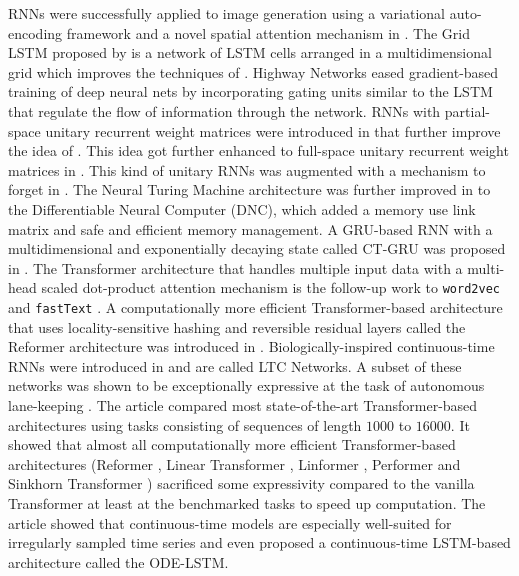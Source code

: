 \documentclass[draft,final]{vutinfth} %
\begin{document}
    RNNs were successfully applied to image generation using a variational auto-encoding framework and a novel spatial attention mechanism in \cite{draw}.
    The Grid LSTM proposed by \cite{grid_lstm} is a network of LSTM cells arranged in a multidimensional grid which improves the techniques of \cite{multidimensional_rnn}.
    Highway Networks \cite{highway_networks} eased gradient-based training of deep neural nets by incorporating gating units similar to the LSTM that regulate the flow of information through the network.
    RNNs with partial-space unitary recurrent weight matrices were introduced in \cite{UnitaryRNNs} that further improve the idea of \cite{SCRN}.
    This idea got further enhanced to full-space unitary recurrent weight matrices in \cite{EfficientUnitaryRNNs}.
    This kind of unitary RNNs was augmented with a mechanism to forget in \cite{unitary_rnn_forget}.
    The Neural Turing Machine architecture was further improved in \cite{DNC} to the Differentiable Neural Computer (DNC), which added a memory use link matrix and safe and efficient memory management.
    A GRU-based RNN with a multidimensional and exponentially decaying state called CT-GRU was proposed in \cite{CTGRU}.
    The Transformer architecture \cite{Transformer} that handles multiple input data with a multi-head scaled dot-product attention mechanism is the follow-up work to \texttt{word2vec} \cite{word2vec} and \texttt{fastText} \cite{fasttext}.
    A computationally more efficient Transformer-based architecture that uses locality-sensitive hashing and reversible residual layers \cite{ReversibleLayer} called the Reformer architecture was introduced in \cite{Reformer}.
    Biologically-inspired continuous-time RNNs were introduced in \cite{LTCNetworks} and are called LTC Networks.
    A subset of these networks was shown to be exceptionally expressive at the task of autonomous lane-keeping \cite{NCP}.
    The article \cite{TransformerVariants} compared most state-of-the-art Transformer-based architectures using tasks consisting of sequences of length $1000$ to $16000$.
    It showed that almost all computationally more efficient Transformer-based architectures (Reformer \cite{Reformer}, Linear Transformer \cite{LinearTransformer}, Linformer \cite{linformer}, Performer \cite{performer} and Sinkhorn Transformer \cite{sinkhorn}) sacrificed some expressivity compared to the vanilla Transformer \cite{Transformer} at least at the benchmarked tasks to speed up computation.
    The article \cite{ODELSTM} showed that continuous-time models are especially well-suited for irregularly sampled time series and even proposed a continuous-time LSTM-based architecture called the ODE-LSTM.
\end{document}
